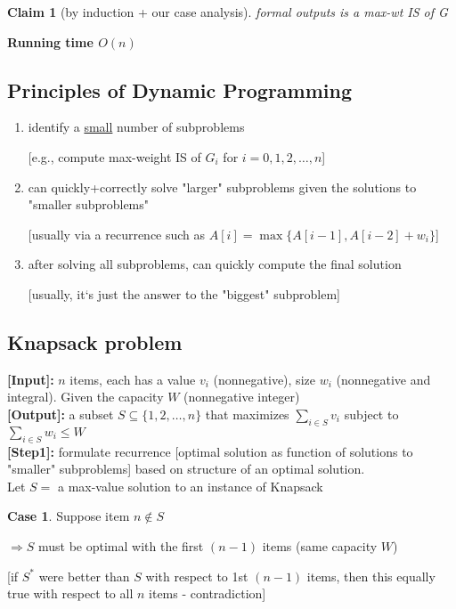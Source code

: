 \documentclass[a4paper,12pt]{article}
\theoremstyle{plain}
\newtheorem{claim}{Claim}
\theoremstyle{definition}
\newtheorem{case}{Case}[subsection]
\theoremstyle{remark}
\begin{document}
\begin{claim} [by induction + our case analysis] formal outputs is a max-wt IS of G\end{claim}

\textbf{Running time $O(n)$}



\subsection{Principles of Dynamic Programming}
\begin{enumerate}
	\item identify a \underline{small} number of subproblems

	[e.g., compute max-weight IS of $G_i$ for $i = 0, 1, 2, \dots, n$]
	\item can quickly+correctly solve "larger" subproblems given the solutions to "smaller subproblems"

	[usually via a recurrence such as $A[i] = \max\{A[i-1], A[i-2]+w_i\}$]

	\item after solving all subproblems, can quickly compute the final solution

	[usually, it`s just the answer to the "biggest" subproblem]
\end{enumerate}



\subsection{Knapsack problem}
\textbf{[Input]:} $n$ items, each has a value $v_i$ (nonnegative), size $w_i$ (nonnegative and integral). Given the capacity $W$ (nonnegative integer)
\\

\textbf{[Output]:} a subset $S \subseteq \{1, 2, \dots, n\}$ that maximizes $\sum\limits_{i \in S} v_i$ subject to $\sum\limits_{i \in S} w_i \leq W$
\\

\textbf{[Step1]:} formulate recurrence [optimal solution as function of solutions to "smaller" subproblems] based on structure of an optimal solution.
\\

Let $S =$ a max-value solution to an instance of Knapsack

\begin{case}
Suppose item $n \notin S$

$\Rightarrow S$ must be optimal with the first $(n-1)$ items (same capacity $W$)

[if $S^*$ were better than $S$ with respect to 1st $(n-1)$ items, then this equally true with respect to all $n$ items - contradiction]
\end{case}
\end{document}
